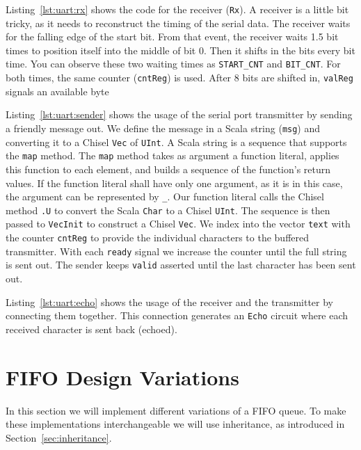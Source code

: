 \documentclass[%
    10pt,
    headinclude, footexclude,
    openright, %
    notitlepage,
    cleardoubleempty,
    headsepline,
    pointlessnumbers,
    bibtotoc, idxtotoc,
    ]{scrbook}
\newcommand{\code}[1]{{\small{\texttt{#1}}}}
\begin{document}
Listing~\ref{lst:uart:rx} shows the code for the receiver (\code{Rx}).
A receiver is a little bit tricky, as it needs to reconstruct the timing of
the serial data. The receiver waits for the falling edge of the start bit.
From that event, the receiver waits 1.5 bit times to position itself into the middle
of bit 0. Then it shifts in the bits every bit time. You can observe these
two waiting times as \code{START\_CNT} and \code{BIT\_CNT}.
For both times, the same counter (\code{cntReg}) is used.
After 8 bits are shifted in, \code{valReg} signals an available byte

Listing~\ref{lst:uart:sender} shows the usage of the serial port transmitter
by sending a friendly message out. We define the message in a Scala
string (\code{msg}) and converting it to a Chisel \code{Vec} of \code{UInt}.
A Scala string is a sequence that supports the \code{map} method.
The \code{map} method takes as argument a function literal, applies this function to
each element, and builds a sequence of the function's return values.
If the function literal shall have only one argument, as it is in this case, the
argument can be represented by \code{\_}. Our function literal calls
the Chisel method \code{.U} to convert the Scala \code{Char} to a Chisel
\code{UInt}. The sequence is then passed to \code{VecInit} to construct
a Chisel \code{Vec}. We index into the vector \code{text} with the counter
\code{cntReg} to provide the individual characters to the buffered transmitter.
With each \code{ready} signal we increase the counter until the full string
is sent out. The sender keeps \code{valid} asserted until the last character
has been sent out.

Listing~\ref{lst:uart:echo} shows the usage of the receiver and the transmitter
by connecting them together. This connection generates an \code{Echo} circuit where each
received character is sent back (echoed).

\section{FIFO Design Variations}
\label{sec:more:fifo}

In this section we will implement different variations of a FIFO queue.
To make these implementations interchangeable we will use inheritance,
as introduced in Section~\ref{sec:inheritance}.
\end{document}
